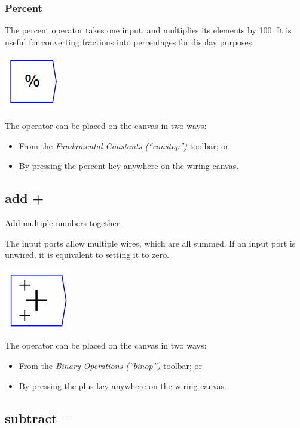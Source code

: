 \subsubsection{Percent}

\label{Operation:percent} The percent operator takes one input, and
multiplies its elements by 100. It is useful for converting fractions
into percentages for display purposes.

\includegraphics{images/PercentOperator}

The operator can be placed on the canvas in two ways:
\begin{itemize}
\item From the \emph{Fundamental Constants (``constop'')} toolbar; or 
\item By pressing the percent key anywhere on the wiring canvas. 
\end{itemize}

\subsection{add +}

\label{Operation:add} Add multiple numbers together.

The input ports allow multiple wires, which are all summed. If an
input port is unwired, it is equivalent to setting it to zero.

\includegraphics{images/PlusSymbol}

The operator can be placed on the canvas in two ways:
\begin{itemize}
\item From the \emph{Binary Operations (``binop'') }toolbar; or 
\item By pressing the plus key anywhere on the wiring canvas. 
\end{itemize}

\subsection{subtract $-$}

